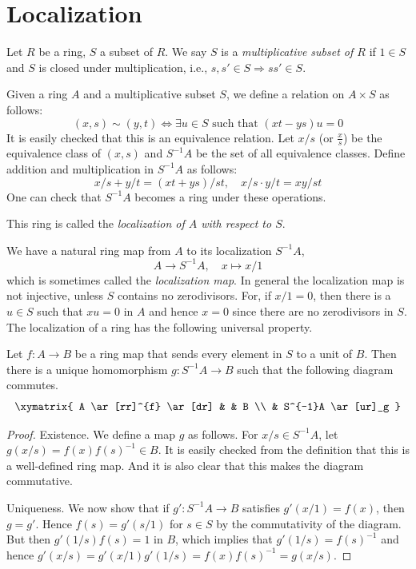 \section{Localization}
\label{section-localization}

\begin{definition}
\label{definition-multiplicative-subset}
Let $R$ be a ring, $S$ a subset of $R$.
We say $S$ is a {\it multiplicative subset of $R$} if
$1\in S$ and $S$ is closed
under multiplication, i.e., $s, s' \in S \Rightarrow ss' \in S$.
\end{definition}

\noindent
Given a ring $A$ and a multiplicative subset $S$, we
define a relation on $A \times S$ as follows:
$$
(x, s) \sim (y, t)
\Leftrightarrow
\exists u \in S \text{ such that } (xt-ys)u = 0
$$
It is easily checked that this is an equivalence relation.
Let $x/s$ (or $\frac{x}{s}$) be the equivalence class of $(x, s)$ and
$S^{-1}A$ be the set of all equivalence classes. Define addition
and multiplication in $S^{-1}A$ as follows:
$$
x/s + y/t = (xt + ys)/st, \quad
x/s \cdot y/t = xy/st
$$
One can check that $S^{-1}A$ becomes a ring under these operations.

\begin{definition}
\label{definition-localization}
This ring is called the {\it localization of $A$ with respect to $S$}.
\end{definition}

\noindent
We have a natural ring map from $A$ to its localization $S^{-1}A$,
$$
A \longrightarrow S^{-1}A, \quad x \longmapsto x/1
$$
which is sometimes called the {\it localization map}. In general the
localization map is not injective, unless $S$ contains no zerodivisors.
For, if $x/1 = 0$, then there is a $u\in S$ such that $xu = 0$ in $A$ and
hence $x = 0$ since there are no zerodivisors in $S$.
The localization of a ring has the following universal property.

\begin{proposition}
\label{proposition-universal-property-localization}
Let $f : A \to B$ be a ring map that sends every element in $S$ to a unit
of $B$. Then there is a unique homomorphism $g : S^{-1}A \to B$ such
that the following diagram commutes.
$$
\xymatrix{
A \ar[rr]^{f} \ar[dr] & & B \\
& S^{-1}A \ar[ur]_g
}
$$
\end{proposition}

\begin{proof}
Existence. We define a map $g$ as follows. For $x/s\in S^{-1}A$, let
$g(x/s) = f(x)f(s)^{-1}\in B$. It is easily checked from the definition
that this is a well-defined ring map. And it is also clear that
this makes the diagram commutative.

\medskip\noindent
Uniqueness. We now show that if $g' : S^{-1}A \to B$
satisfies $g'(x/1) = f(x)$, then $g = g'$. Hence $f(s) = g'(s/1)$ for
$s \in S$ by the commutativity of the diagram. But then $g'(1/s)f(s) = 1$
in $B$, which implies that $g'(1/s) = f(s)^{-1}$ and hence
$g'(x/s) = g'(x/1)g'(1/s) = f(x)f(s)^{-1} = g(x/s)$.
\end{proof}

